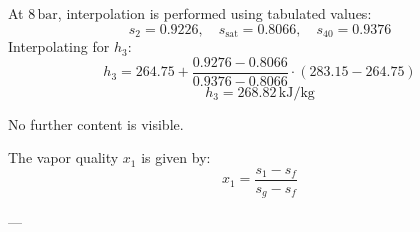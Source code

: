 At \( 8 \, \text{bar} \), interpolation is performed using tabulated values:  
\[
s_2 = 0.9226, \quad s_{\text{sat}} = 0.8066, \quad s_{40} = 0.9376
\]  
Interpolating for \( h_3 \):  
\[
h_3 = 264.75 + \frac{0.9276 - 0.8066}{0.9376 - 0.8066} \cdot (283.15 - 264.75)
\]  
\[
h_3 = 268.82 \, \text{kJ/kg}
\]  

No further content is visible.

The vapor quality \( x_1 \) is given by:  
\[
x_1 = \frac{s_1 - s_f}{s_g - s_f}
\]  

---